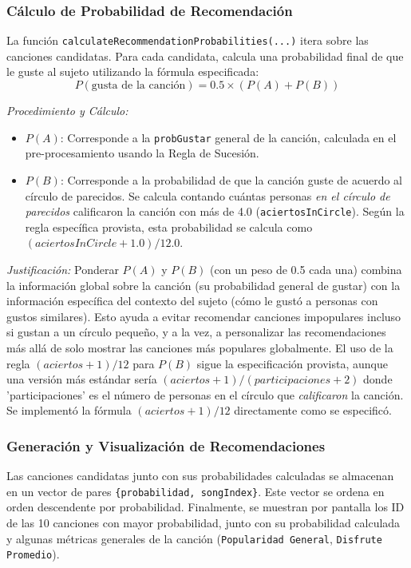 \documentclass{article}
\begin{document}
\subsubsection{Cálculo de Probabilidad de Recomendación}
La función \texttt{calculateRecommendationProbabilities(...)} itera sobre las canciones candidatas. Para cada candidata, calcula una probabilidad final de que le guste al sujeto utilizando la fórmula especificada:
\[
P(\text{gusta de la canción}) = 0.5 \times (P(A) + P(B))
\]

\vspace{0.5em} %
\noindent \textit{Procedimiento y Cálculo:}
\begin{itemize}[label=\textbullet]
    \item \(P(A)\): Corresponde a la \texttt{probGustar} general de la canción, calculada en el pre-procesamiento usando la Regla de Sucesión.
    \item \(P(B)\): Corresponde a la probabilidad de que la canción guste de acuerdo al círculo de parecidos. Se calcula contando cuántas personas \textit{en el círculo de parecidos} calificaron la canción con más de 4.0 (\texttt{aciertosInCircle}). Según la regla específica provista, esta probabilidad se calcula como \((aciertosInCircle + 1.0) / 12.0\).
\end{itemize}

\vspace{0.5em} %
\noindent \textit{Justificación:} Ponderar \(P(A)\) y \(P(B)\) (con un peso de 0.5 cada una) combina la información global sobre la canción (su probabilidad general de gustar) con la información específica del contexto del sujeto (cómo le gustó a personas con gustos similares). Esto ayuda a evitar recomendar canciones impopulares incluso si gustan a un círculo pequeño, y a la vez, a personalizar las recomendaciones más allá de solo mostrar las canciones más populares globalmente. El uso de la regla \((aciertos + 1) / 12\) para \(P(B)\) sigue la especificación provista, aunque una versión más estándar sería \((aciertos + 1) / (participaciones + 2)\) donde 'participaciones' es el número de personas en el círculo que \textit{calificaron} la canción. Se implementó la fórmula \((aciertos + 1) / 12\) directamente como se especificó.

\subsubsection{Generación y Visualización de Recomendaciones}
Las canciones candidatas junto con sus probabilidades calculadas se almacenan en un vector de pares \texttt{\{probabilidad, songIndex\}}. Este vector se ordena en orden descendente por probabilidad. Finalmente, se muestran por pantalla los ID de las 10 canciones con mayor probabilidad, junto con su probabilidad calculada y algunas métricas generales de la canción (\texttt{Popularidad General}, \texttt{Disfrute Promedio}).
\end{document}
